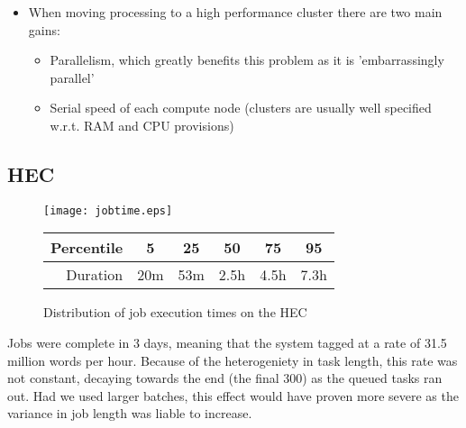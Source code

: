 \begin{itemize}
    \item When moving processing to a high performance cluster there are two main gains:
        \begin{itemize}
            \item Parallelism, which greatly benefits this problem as it is 'embarrassingly parallel'
            \item Serial speed of each compute node (clusters are usually well specified w.r.t. RAM and CPU provisions)
        \end{itemize}
\end{itemize}


\subsection{HEC}

\begin{figure}[h]
    \centering
    \texttt{[image: jobtime.eps]}

    \begin{tabular}{ | r | c | c | c | c | c | }
        \hline
        Percentile & 5 & 25 & 50 & 75 & 95 \\ \hline
        Duration & 20m & 53m & 2.5h & 4.5h & 7.3h \\ \hline
    \end{tabular}

    \caption{Distribution of job execution times on the HEC}
    \label{fig:jobtimes}
\end{figure}


% 
% 
% 
% 




Jobs were complete in 3 days, meaning that the system tagged at a rate of 31.5 million words 
per hour.  Because of the heterogeniety in task length, this rate was not constant, decaying towards the end (the final 300) as the queued tasks ran out.  Had we used larger batches, this effect would have proven more severe as the variance in job length was liable to increase.


